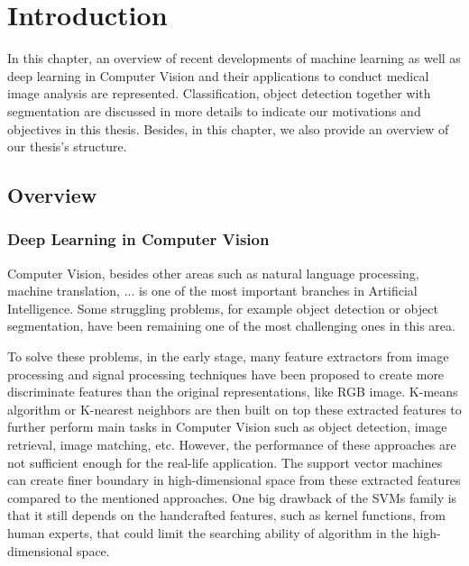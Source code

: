 \chapter{Introduction}
\label{chap-introduction}
\begin{ChapAbstract}
In this chapter, an overview of recent developments of machine learning as well as deep learning in Computer Vision and their applications to conduct medical image analysis are represented. Classification, object detection together with segmentation are discussed in more details to indicate our motivations and objectives in this thesis. Besides, in this chapter, we also provide an overview of our thesis's structure.

\end{ChapAbstract}

\section{Overview}
\subsection{Deep Learning in Computer Vision}

Computer Vision, besides other areas such as natural language processing, machine translation, ... is one of the most important branches in Artificial Intelligence. Some struggling problems, for example object detection or object segmentation, have been remaining one of the most challenging ones in this area. 

To solve these problems, in the early stage, many feature extractors \cite{SIFTFeatures,SURFFeatures} from image processing and signal processing techniques have been proposed to create more discriminate features than the original representations, like RGB image. K-means algorithm \cite{kmean} or K-nearest neighbors \cite{knearestneighbor} are then built on top these extracted features to further perform main tasks in Computer Vision such as object detection, image retrieval, image matching, etc. However, the performance of these approaches are not sufficient enough for the real-life application. The support vector machines \cite{SVM} can create finer boundary in high-dimensional space from these extracted features compared to the mentioned approaches. One big drawback of the SVMs \cite{SVM} family is that it still depends on the handcrafted features, such as kernel functions, from human experts, that could limit the searching ability of algorithm in the high-dimensional space.    

